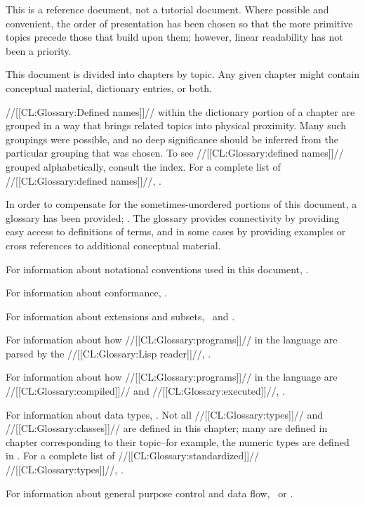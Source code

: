 

This is a reference document, not a tutorial document.  Where possible and convenient, the order of presentation has been chosen so that the more primitive topics precede those that build upon them;  however, linear readability has not been a priority.

This document is divided into chapters by topic. Any given chapter might contain conceptual material, dictionary entries, or both.

//[[CL:Glossary:Defined names]]// within the dictionary portion of a chapter are grouped in a way that brings related topics into physical proximity. Many such groupings were possible, and no deep significance should be inferred from the particular grouping that was chosen. To see //[[CL:Glossary:defined names]]// grouped alphabetically, consult the index. For a complete list of //[[CL:Glossary:defined names]]//, \seesection\CLsymbols.

In order to compensate for the sometimes-unordered portions of this document,  a glossary has been provided; \seechapter\Glossary. The glossary provides connectivity by providing easy access to  definitions of terms, and in some cases by providing examples or  cross references to additional conceptual material.

For information about notational conventions used in this document, \seesection\Definitions.

For information about conformance, \seesection\Conformance. 

For information about extensions and subsets, \seesection\LanguageExtensions\ and \secref\LanguageSubsets.

For information about how //[[CL:Glossary:programs]]// in the language are parsed by the //[[CL:Glossary:Lisp reader]]//, \seechapter\Syntax.

For information about how //[[CL:Glossary:programs]]// in the language are //[[CL:Glossary:compiled]]// and //[[CL:Glossary:executed]]//, \seechapter\EvaluationAndCompilation.

For information about data types, \seechapter\TypesAndClasses. Not all //[[CL:Glossary:types]]// and //[[CL:Glossary:classes]]// are defined in this chapter; many are defined in chapter corresponding to their topic--for example, the numeric types are defined in \chapref\Numbers. For a complete list of //[[CL:Glossary:standardized]]// //[[CL:Glossary:types]]//,  \seefigure\StandardizedAtomicTypeSpecs.

For information about general purpose control and data flow, \seechapter\DataAndControlFlow\ or \chapref\Iteration.

